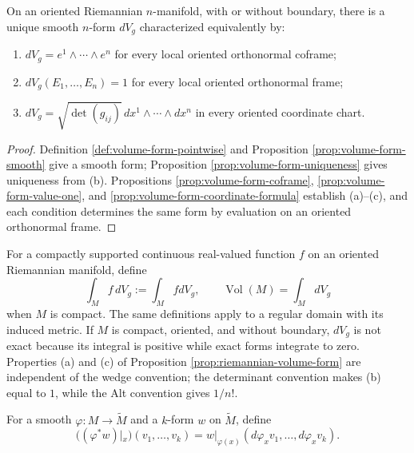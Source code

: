 \begin{proposition}
\label{prop:riemannian-volume-form}
\leanok
{}
On an oriented Riemannian $n$-manifold, with or without boundary, there is a unique smooth $n$-form $dV_g$ characterized equivalently by:
\begin{enumerate}[label=(\alph*)]
\item $dV_g=e^1\wedge\cdots\wedge e^n$ for every local oriented orthonormal coframe;
\item $dV_g(E_1,\ldots,E_n)=1$ for every local oriented orthonormal frame;
\item $dV_g=\sqrt{\det(g_{ij})}\,dx^1\wedge\cdots\wedge dx^n$ in every oriented coordinate chart.
\end{enumerate}
\end{proposition}

\begin{proof}
\leanok
{}
\sketch Definition \ref{def:volume-form-pointwise} and Proposition \ref{prop:volume-form-smooth} give a smooth form; Proposition \ref{prop:volume-form-uniqueness} gives uniqueness from (b). Propositions \ref{prop:volume-form-coframe}, \ref{prop:volume-form-value-one}, and \ref{prop:volume-form-coordinate-formula} establish (a)--(c), and each condition determines the same form by evaluation on an oriented orthonormal frame.
\end{proof}

For a compactly supported continuous real-valued function $f$ on an oriented Riemannian manifold, define
\[
\int_M f\,dV_g:=\int_M f dV_g,
\qquad \operatorname{Vol}(M)=\int_MdV_g
\]
when $M$ is compact. The same definitions apply to a regular domain with its induced metric. If $M$ is compact, oriented, and without boundary, $dV_g$ is not exact because its integral is positive while exact forms integrate to zero. Properties (a) and (c) of Proposition \ref{prop:riemannian-volume-form} are independent of the wedge convention; the determinant convention makes (b) equal to $1$, while the Alt convention gives $1/n!$.

\begin{definition}
\label{def:pullback-alternating}
\leanok
For a smooth $\varphi:M\to\widetilde M$ and a $k$-form $w$ on $\widetilde M$, define
\[
((\varphi^*w)|_x)(v_1,\ldots,v_k)=w|_{\varphi(x)}(d\varphi_xv_1,\ldots,d\varphi_xv_k).
\]
\end{definition}

